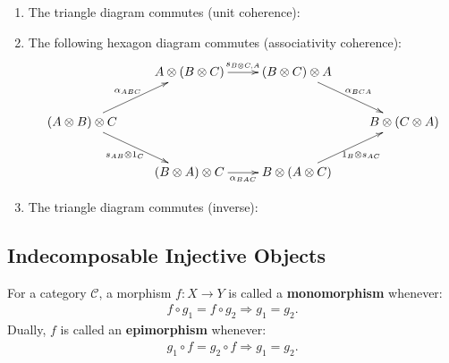 \documentclass[openany, a4paper]{amsbook}
\theoremstyle{definition}
\numberwithin{equation}{chapter}
\newcommand{\T}[1]{{\mathbb{T}}_{\aleph_{#1}}}
\begin{document}
\begin{enumerate}
    \item The triangle diagram commutes (unit coherence):
    \begin{center}
    \end{center}
    \item The following hexagon diagram commutes (associativity coherence):
    \[
        \xymatrix{ 
        & A \otimes (B \otimes C) \ar^{s_{B \otimes C, A}}[r] & (B \otimes C) \otimes A \ar^{\alpha_{BCA}}[dr] & \\
        (A \otimes B) \otimes C \ar^{\alpha_{ABC}}[ur] \ar_{s_{AB} \otimes 1_C}[dr] & & & B \otimes (C \otimes A) \\
        & (B \otimes A) \otimes C \ar_{\alpha_{BAC}}[r] & B \otimes (A \otimes C) \ar_{1_B \otimes s_{AC}}[ur] & 
        }
    \]
    \item The triangle diagram commutes (inverse):
    \begin{center}
    \end{center}
    
\end{enumerate}

\subsection{Indecomposable Injective Objects}
For a category $\mathcal{C}$, a morphism $f: X \to Y$ is called a \textbf{monomorphism} whenever:
\begin{align*}
    f \circ g_1 = f \circ g_2 \Longrightarrow g_1 = g_2.
\end{align*}
Dually, $f$ is called an \textbf{epimorphism} whenever: 
\begin{align*}
    g_1 \circ f = g_2 \circ f \Longrightarrow g_1 = g_2.
\end{align*}
\end{document}
